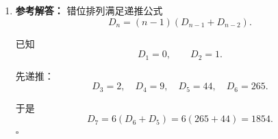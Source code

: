 \documentclass[11pt,a4paper,fontset=fandol]{ctexart}
\newenvironment{solution}{\par\noindent\textbf{参考解答：}}{\hfill$\square$\par}
\begin{document}
\begin{enumerate}
\begin{solution}
  所以
  \[
  r_n=r_{n-1}+r_{n-2}.
  \]

  初值为
  \[
  r_1=1,\qquad r_2=2.
  \]

  因此
  \[
  r_3=3,\quad r_4=5,\quad r_5=8,\quad r_6=13,\quad r_7=21.
  \]

  所以答案为
  \[
  21.
  \]
  \end{solution}

  \item \begin{solution}
  错位排列满足递推公式
  \[
  D_n=(n-1)(D_{n-1}+D_{n-2}).
  \]

  已知
  \[
  D_1=0,\qquad D_2=1.
  \]

  先递推：
  \[
  D_3=2,
  \quad
  D_4=9,
  \quad
  D_5=44,
  \quad
  D_6=265.
  \]

  于是
  \[
  D_7=6(D_6+D_5)=6(265+44)=1854.
  \]
  \end{solution}
\end{enumerate}
\end{document}
